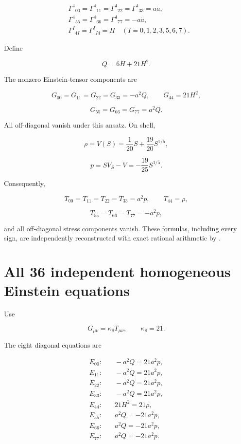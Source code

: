 \documentclass[11pt]{article}
\begin{document}
\[
\begin{aligned}
&\Gamma^4{}_{00}=\Gamma^4{}_{11}=\Gamma^4{}_{22}
=\Gamma^4{}_{33}=a\dot a,\\
&\Gamma^4{}_{55}=\Gamma^4{}_{66}=\Gamma^4{}_{77}=-a\dot a,\\
&\Gamma^I{}_{4I}=\Gamma^I{}_{I4}=H
\quad (I=0,1,2,3,5,6,7).
\end{aligned}
\]

Define

\[
Q=6\dot H+21H^2.
\]

The nonzero Einstein-tensor components are

\[
G_{00}=G_{11}=G_{22}=G_{33}=-a^2Q,
\qquad G_{44}=21H^2,
\]

\[
G_{55}=G_{66}=G_{77}=a^2Q.
\]

All off-diagonal \texttt{} vanish under this ansatz. On shell,

\[
\rho=V(S)=\frac1{20}S+\frac{19}{20}S^{1/5},
\]

\[
p=SV_S-V=-\frac{19}{25}S^{1/5}.
\]

Consequently,

\[
T_{00}=T_{11}=T_{22}=T_{33}=a^2p,
\qquad T_{44}=\rho,
\]

\[
T_{55}=T_{66}=T_{77}=-a^2p,
\]

and all off-diagonal stress components vanish. These formulas, including every sign, are independently reconstructed with exact rational arithmetic by \texttt{}.

\section{All 36 independent homogeneous Einstein equations}

Use

\[
G_{\mu\nu}=\kappa_8 T_{\mu\nu},\qquad \kappa_8=21.
\]

The eight diagonal equations are

\[
\begin{aligned}
E_{00}:&\quad -a^2Q=21a^2p,\\
E_{11}:&\quad -a^2Q=21a^2p,\\
E_{22}:&\quad -a^2Q=21a^2p,\\
E_{33}:&\quad -a^2Q=21a^2p,\\
E_{44}:&\quad 21H^2=21\rho,\\
E_{55}:&\quad a^2Q=-21a^2p,\\
E_{66}:&\quad a^2Q=-21a^2p,\\
E_{77}:&\quad a^2Q=-21a^2p.
\end{aligned}
\]
\end{document}
